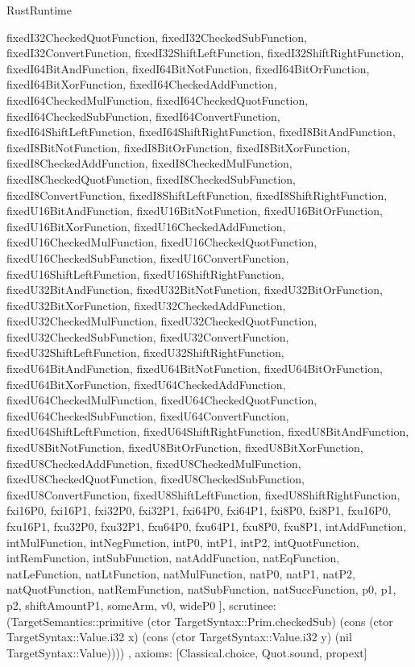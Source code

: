 \begin{lexlean}{RustRuntime}
\begin{semanticmodule}
{{      fixedI32CheckedQuotFunction,
      fixedI32CheckedSubFunction,
      fixedI32ConvertFunction,
      fixedI32ShiftLeftFunction,
      fixedI32ShiftRightFunction,
      fixedI64BitAndFunction,
      fixedI64BitNotFunction,
      fixedI64BitOrFunction,
      fixedI64BitXorFunction,
      fixedI64CheckedAddFunction,
      fixedI64CheckedMulFunction,
      fixedI64CheckedQuotFunction,
      fixedI64CheckedSubFunction,
      fixedI64ConvertFunction,
      fixedI64ShiftLeftFunction,
      fixedI64ShiftRightFunction,
      fixedI8BitAndFunction,
      fixedI8BitNotFunction,
      fixedI8BitOrFunction,
      fixedI8BitXorFunction,
      fixedI8CheckedAddFunction,
      fixedI8CheckedMulFunction,
      fixedI8CheckedQuotFunction,
      fixedI8CheckedSubFunction,
      fixedI8ConvertFunction,
      fixedI8ShiftLeftFunction,
      fixedI8ShiftRightFunction,
      fixedU16BitAndFunction,
      fixedU16BitNotFunction,
      fixedU16BitOrFunction,
      fixedU16BitXorFunction,
      fixedU16CheckedAddFunction,
      fixedU16CheckedMulFunction,
      fixedU16CheckedQuotFunction,
      fixedU16CheckedSubFunction,
      fixedU16ConvertFunction,
      fixedU16ShiftLeftFunction,
      fixedU16ShiftRightFunction,
      fixedU32BitAndFunction,
      fixedU32BitNotFunction,
      fixedU32BitOrFunction,
      fixedU32BitXorFunction,
      fixedU32CheckedAddFunction,
      fixedU32CheckedMulFunction,
      fixedU32CheckedQuotFunction,
      fixedU32CheckedSubFunction,
      fixedU32ConvertFunction,
      fixedU32ShiftLeftFunction,
      fixedU32ShiftRightFunction,
      fixedU64BitAndFunction,
      fixedU64BitNotFunction,
      fixedU64BitOrFunction,
      fixedU64BitXorFunction,
      fixedU64CheckedAddFunction,
      fixedU64CheckedMulFunction,
      fixedU64CheckedQuotFunction,
      fixedU64CheckedSubFunction,
      fixedU64ConvertFunction,
      fixedU64ShiftLeftFunction,
      fixedU64ShiftRightFunction,
      fixedU8BitAndFunction,
      fixedU8BitNotFunction,
      fixedU8BitOrFunction,
      fixedU8BitXorFunction,
      fixedU8CheckedAddFunction,
      fixedU8CheckedMulFunction,
      fixedU8CheckedQuotFunction,
      fixedU8CheckedSubFunction,
      fixedU8ConvertFunction,
      fixedU8ShiftLeftFunction,
      fixedU8ShiftRightFunction,
      fxi16P0,
      fxi16P1,
      fxi32P0,
      fxi32P1,
      fxi64P0,
      fxi64P1,
      fxi8P0,
      fxi8P1,
      fxu16P0,
      fxu16P1,
      fxu32P0,
      fxu32P1,
      fxu64P0,
      fxu64P1,
      fxu8P0,
      fxu8P1,
      intAddFunction,
      intMulFunction,
      intNegFunction,
      intP0,
      intP1,
      intP2,
      intQuotFunction,
      intRemFunction,
      intSubFunction,
      natAddFunction,
      natEqFunction,
      natLeFunction,
      natLtFunction,
      natMulFunction,
      natP0,
      natP1,
      natP2,
      natQuotFunction,
      natRemFunction,
      natSubFunction,
      natSuccFunction,
      p0,
      p1,
      p2,
      shiftAmountP1,
      someArm,
      v0,
      wideP0
    ],
    scrutinee: (TargetSemantics::primitive (ctor TargetSyntax::Prim.checkedSub) (cons (ctor TargetSyntax::Value.i32 x) (cons (ctor TargetSyntax::Value.i32 y) (nil TargetSyntax::Value))))
  },
  axioms: [Classical.choice, Quot.sound, propext]
}


\end{semanticmodule}
\end{lexlean}
